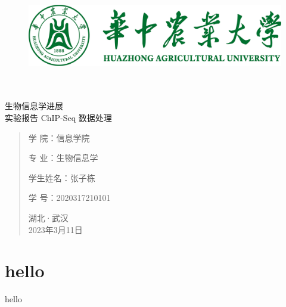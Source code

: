 \documentclass[UTF8]{ctexart}
\date{}
\begin{document}
	\begin{figure}[t]
		\centering
        \includegraphics[scale=0.7]{img/HZAU.png}
	\end{figure}

	\begin{center}
		\quad \\
		\quad \\
		\heiti \fontsize{45}{17} 生物信息学进展\\实验报告
		\vskip 3.5cm
		\heiti {} ChIP-Seq 数据处理
	\end{center}
	\vskip 3.0cm

	\begin{quotation}
		\heiti \fontsize{15}{15}
		\doublespacing
		\par\setlength\parindent{12em}
		\quad

		学\hspace{0.61cm} 院：信息学院

		专\hspace{0.61cm} 业：生物信息学

		学生姓名：张子栋

		学\hspace{0.61cm} 号：2020317210101

		\vskip 2cm
		\centering
        湖北·武汉\\
		2023年3月11日
	\end{quotation}

	\section{hello}
	hello 
\end{document}
